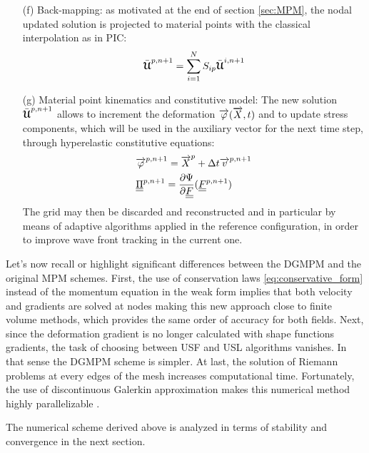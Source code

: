 \begin{itemize}
\item[(f)] Back-mapping: as motivated at the end of section \ref{sec:MPM}, the nodal updated solution is projected to material points with the classical interpolation as in PIC:
  \begin{equation}
    \bar{{\boldsymbol{\mathcal{U}}}}^{p,n+1} = \sum_{i=1}^{N} S_{ip}\bar{{\boldsymbol{\mathcal{U}}}}^{i,n+1}
  \end{equation}
\item[(g)] Material point kinematics and constitutive model: The new solution $\bar{{\boldsymbol{\mathcal{U}}}}^{p,n+1}$ allows to increment the deformation ${\overrightarrow{\varphi}}({\overrightarrow{X}},t)$ and to update stress components, which will be used in the auxiliary vector for the next time step, through hyperelastic constitutive equations:
  \begin{align}
    & {\overrightarrow{\varphi}}^{p,n+1} = {\overrightarrow{X}}^p + \Delta t {\overrightarrow{v}}^{p,n+1} \\
    & {\underline{\underline{\Pi}}}^{p,n+1} =  \frac{\partial \Psi}{\partial {\underline{\underline{F}}}}({\underline{\underline{F}}}^{p,n+1})
  \end{align}
  The grid may then be discarded and reconstructed and in particular by means of adaptive algorithms applied in the reference configuration, in order to improve wave front tracking in the current one.
\end{itemize}

Let's now recall or highlight significant differences between the DGMPM and the original MPM schemes. 
First, the use of conservation laws \eqref{eq:conservative_form} instead of the momentum equation in the weak form implies that both velocity and gradients are solved at nodes making this new approach close to finite volume methods, which provides the same order of accuracy for both fields. 
Next, since the deformation gradient is no longer calculated with shape functions gradients, the task of choosing between USF and USL algorithms vanishes. In that sense the DGMPM scheme is simpler.
At last, the solution of Riemann problems at every edges of the mesh increases computational time. Fortunately, the use of discontinuous Galerkin approximation makes this numerical method highly parallelizable \cite{Cockburn}.

The numerical scheme derived above is analyzed in terms of stability and convergence in the next section.


